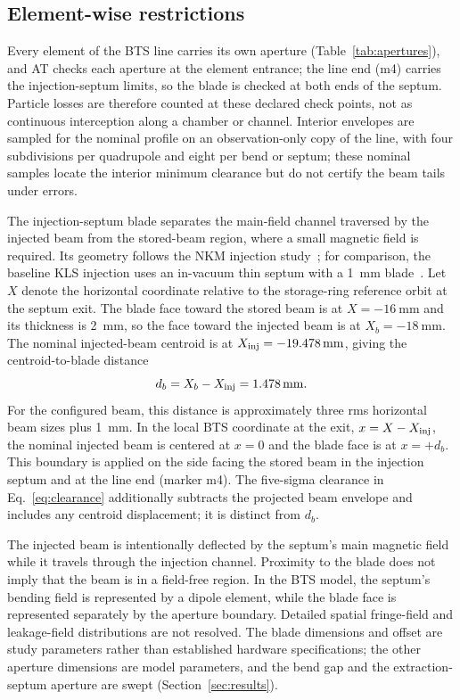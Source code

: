 \documentclass[final,5p,twocolumn]{elsarticle}
\begin{document}
\subsection{Element-wise restrictions}\label{sec:apertures}
Every element of the BTS line carries its own aperture
(Table~\ref{tab:apertures}), and AT checks each aperture at the element entrance;
the line end (m4) carries the injection-septum limits, so the blade is checked at
both ends of the septum. Particle losses are therefore counted at these declared
check points, not as continuous interception along a chamber or channel.
Interior envelopes are sampled for the nominal profile on an observation-only copy of
the line, with four subdivisions per quadrupole and eight per bend or septum; these
nominal samples locate the interior minimum clearance but do not certify the beam
tails under errors.

The injection-septum blade separates the main-field channel traversed by the
injected beam from the stored-beam region, where a small magnetic field is
required. Its geometry follows the NKM injection study~\cite{ParkNKM2026}; for
comparison, the baseline KLS injection uses an in-vacuum thin septum with a
\SI{1}{\milli\metre} blade~\cite{KLSTDR2025}. Let $X$ denote the horizontal coordinate relative to the
storage-ring reference orbit at the septum exit. The blade face toward the stored
beam is at $X=\SI{-16}{\milli\metre}$ and its thickness is \SI{2}{\milli\metre},
so the face toward the injected beam is at $X_b=\SI{-18}{\milli\metre}$.
The nominal injected-beam centroid is at $X_{\rm inj}=\SI{-19.478}{\milli\metre}$,
giving the centroid-to-blade distance
\begin{equation}
 d_b=X_b-X_{\rm inj}=\SI{1.478}{\milli\metre}.
 \label{eq:blade-distance}
\end{equation}
For the configured beam, this distance is approximately three rms horizontal
beam sizes plus \SI{1}{\milli\metre}. In the local BTS coordinate at the exit, $x=X-X_{\rm inj}$,
the nominal injected beam is centered at $x=0$ and the blade face is at
$x=+d_b$. This boundary is applied on the side facing the stored beam in the
injection septum and at the line end (marker m4). The five-sigma clearance in
Eq.~\ref{eq:clearance} additionally subtracts the projected beam envelope and
includes any centroid displacement; it is distinct from $d_b$.

The injected beam is intentionally deflected by the septum's main magnetic field
while it travels through the injection channel. Proximity to the blade does not
imply that the beam is in a field-free region. In the BTS model, the septum's
bending field is represented by a dipole element, while the blade face is
represented separately by the aperture boundary. Detailed spatial fringe-field
and leakage-field distributions are not resolved. The blade dimensions and offset
are study parameters rather than established hardware specifications; the other
aperture dimensions are model parameters, and the bend gap and the
extraction-septum aperture are swept (Section~\ref{sec:results}).
\end{document}

